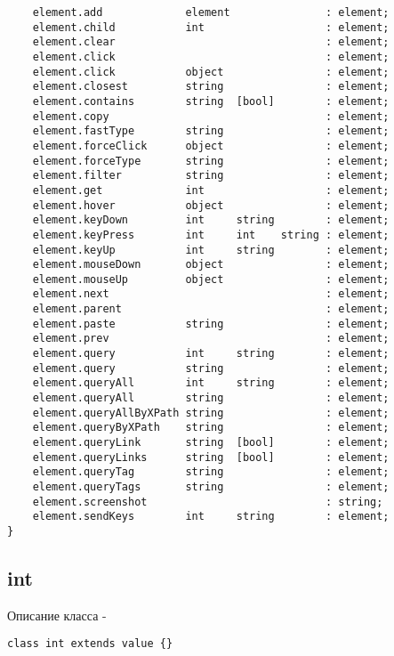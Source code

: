 \begin{verbatim}
    element.add             element               : element;
    element.child           int                   : element;
    element.clear                                 : element;
    element.click                                 : element;
    element.click           object                : element;
    element.closest         string 	              : element;
    element.contains        string 	[bool]        : element;
    element.copy                                  : element;
    element.fastType        string                : element;
    element.forceClick      object                : element;
    element.forceType       string                : element;
    element.filter          string                : element;
    element.get             int                   : element;
    element.hover           object                : element;
    element.keyDown         int     string        : element;
    element.keyPress        int     int    string : element;
    element.keyUp           int     string        : element;
    element.mouseDown       object                : element;
    element.mouseUp         object                : element;
    element.next                                  : element;
    element.parent                                : element;
    element.paste           string                : element;
    element.prev                                  : element;
    element.query           int     string        : element;
    element.query           string                : element;
    element.queryAll        int     string        : element;
    element.queryAll        string                : element;
    element.queryAllByXPath string 	              : element;
    element.queryByXPath    string 	              : element;
    element.queryLink       string 	[bool]        : element;
    element.queryLinks      string  [bool]        : element;
    element.queryTag        string                : element;
    element.queryTags       string                : element;
    element.screenshot                            : string;
    element.sendKeys        int     string        : element;
}
\end{verbatim}

\subsection{{\color{lightblue} int}}

\noindent Описание класса \integer -
\begin{verbatim}
class int extends value {}
\end{verbatim}

